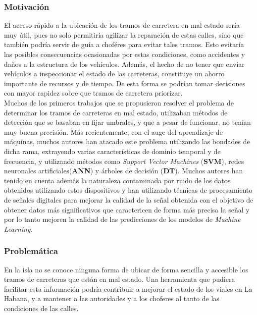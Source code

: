 	\subsubsection*{Motivación}
		El acceso rápido a la ubicación de los tramos de carretera en mal estado sería muy útil, pues no solo permitiría agilizar la
		reparación de estas calles, sino que también podría servir de guía a choféres para evitar tales tramos. Esto evitaría las posibles
		consecuencias ocasionadas por estas condiciones, como accidentes y daños a la estructura de los vehículos. Además, el hecho de no tener que
		enviar vehículos a inspeccionar el estado de las carreteras, constituye un ahorro importante de recursos y de tiempo. De esta forma se podrían
		tomar decisiones con mayor rapidez sobre que tramos de carretera priorizar.\\
		Muchos de los primeros trabajos que se propusieron resolver el problema de determinar los tramos de carreteras en mal estado, utilizaban
		métodos de detección que se basaban en fijar umbrales, y que a pesar de funcionar, no tenían muy buena precisión. Más recientemente, con el auge del aprendizaje de máquinas, muchos autores han atacado este problema utilizando
		las bondades de dicha rama, extrayendo varias características de dominio temporal y de frecuencia, y utilizando métodos como \emph{Support Vector
		Machines} (\textbf{SVM}), redes neuronales artificiales(\textbf{ANN}) y árboles de decisión (\textbf{DT}). Muchos autores han tenido en cuenta además la naturaleza contaminada por ruido de
		los datos obtenidos utilizando estos dispositivos y han utilizando técnicas de procesamiento de señales digitales para mejorar la calidad de la señal
		obtenida con el objetivo de obtener datos más significativos que caractericen de forma más precisa la señal y por lo tanto mejoren la calidad de las
		predicciones de los modelos de \emph{Machine Learning}.\\
		
	\subsubsection*{Problemática}
		En la isla no se conoce ninguna forma de ubicar de forma sencilla y accesible los tramos de carreteras que están en mal estado. Una herramienta
		que pudiera facilitar esta información podría contribuir a mejorar el estado de los viales en La Habana, y a mantener a las autoridades y a los choferes
		al tanto de las condiciones de las calles.
		
